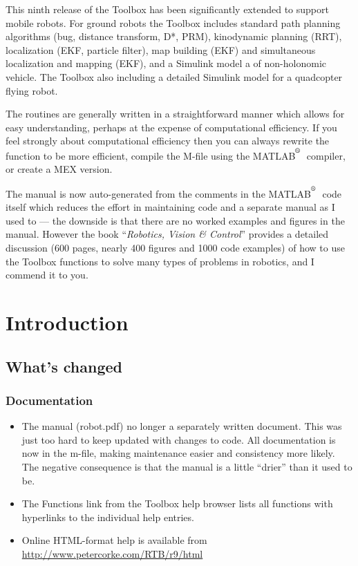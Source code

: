 \documentclass[a4paper]{report}
\def\Mlab{MATLAB$^{\textsuperscript{\textregistered}}$}
\begin{document}
This ninth release of the Toolbox has been significantly extended to support mobile robots.
For ground robots the Toolbox includes standard path planning algorithms (bug, distance transform, D*, PRM), kinodynamic planning (RRT),
localization (EKF, particle filter), map building (EKF) and simultaneous localization and mapping (EKF), and
a Simulink model a of non-holonomic vehicle.
The Toolbox also including a detailed Simulink model for a quadcopter flying robot.

The routines are generally written in a straightforward manner which allows
for easy understanding, perhaps at the expense of computational efficiency.
If you feel strongly about computational efficiency then you can always
rewrite the function to be more efficient,
compile the M-file using the \Mlab\   compiler, or
create a MEX version.

The manual is now auto-generated from the comments in the \Mlab\ code itself which reduces the effort
in maintaining code and a separate manual as I used to --- the downside is that there are no worked examples and figures in the manual.
However the book ``\textit{Robotics, Vision \& Control}''  provides a detailed discussion (600 pages, nearly 400 figures and 1000 code examples)
of how to use the Toolbox functions to
solve many types of problems in robotics, and I commend it to you.


\newpage
\tableofcontents
\newpage
\chapter{Introduction}
\section{What's changed}

\subsection{Documentation}
\begin{itemize}
\item The manual (robot.pdf) no longer a separately written document.  This was just too hard to keep updated with changes to code.
All documentation is now in the m-file, making maintenance easier and consistency more likely.
The negative consequence is that the manual is a little ``drier'' than it used to be.
\item The Functions link from the Toolbox help browser lists all functions with hyperlinks to the individual help entries.
\item Online HTML-format help is available from \url{http://www.petercorke.com/RTB/r9/html}
\end{itemize}
\end{document}
